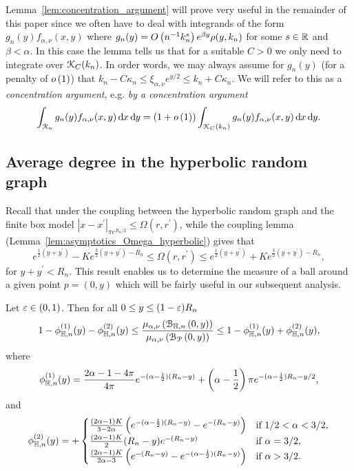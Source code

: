 \begin{remark}\label{rmk:concentration_argument}
Lemma~\ref{lem:concentration_argument} will prove very useful in the remainder of this paper since we often have to deal with integrands of the form $g_n(y) f_{\alpha,\nu}(x,y)$ where $g_n(y) = O\left(n^{-1} k_n^{s}\right)e^{\beta y}\rho(y,k_n)$ for some $s \in {\ensuremath{\mathbb R}}$ and $\beta < \alpha$. In this case the lemma tells us that for a suitable $C > 0$ we only need to integrate over ${\mathcal K}_C(k_n)$. In order words, we may always assume for $g_n(y)$ (for a penalty of $o\left(1\right)$) that $k_n - C \kappa_n \le \xi_{\alpha,\nu} e^{y/2} \le k_n + C \kappa_n$. We will refer to this as a \emph{concentration argument}, e.g. \emph{by a concentration argument}
\[
	\int_{{\mathcal R}_n} g_n(y) f_{\alpha, \nu}(x,y) \operatorname{\mathrm{d}\hspace{-2pt}} x \operatorname{\mathrm{d}\hspace{-2pt}} y 
	= (1+o\left(1\right)) \int_{{\mathcal K}_C(k_n)} g_n(y) f_{\alpha, \nu}(x,y) \operatorname{\mathrm{d}\hspace{-2pt}} x \operatorname{\mathrm{d}\hspace{-2pt}} y.
\]
\end{remark}

\subsection{Average degree in the hyperbolic random graph}\label{ssec:average_degree_HP_n}

Recall that under the coupling between the hyperbolic random graph and the finite box model $|x-x^\prime|_{\pi e^{R_n/2}} \le \Omega(r,r^\prime)$, while the coupling lemma (Lemma~\ref{lem:asymptotics_Omega_hyperbolic}) gives that  
\[
	e^{\frac{1}{2}(y+y^\prime)} - K e^{\frac{3}{2}(y+y^\prime) - R_n} \leq \Omega(r, r^\prime) 
		\leq  e^{\frac{1}{2}(y+y^\prime)} + K e^{\frac{3}{2}(y+y^\prime) - R_n},
\]
for $y + y^\prime < R_n$. This result enables us to determine the measure of a ball around a given point $p=(0,y)$ which will be fairly useful in our subsequent analysis. 

\begin{lemma}\label{lem:average_degree_hyperbolic}
Let $\varepsilon \in (0, 1)$. Then for all $0 \le y \le (1 - \varepsilon)R_n$
\[
	 1 - \phi_{\mathbb{H},n}^{(1)}(y) - \phi_{\mathbb{H},n}^{(2)}(y) \le \frac{\mu_{\alpha,\nu}\left({\mathcal B}_{\mathbb{H},n}\left(0,y\right)\right)}{\mu_{\alpha,\nu}\left({\mathcal B}_{{\mathcal P}}\left(0,y\right)\right)} 
	 \le 1 - \phi_{\mathbb{H},n}^{(1)}(y) + \phi_{\mathbb{H},n}^{(2)}(y),
\]
where
\[
	\phi_{\mathbb{H},n}^{(1)}(y) = \frac{2\alpha - 1 - 4\pi}{4\pi} e^{-(\alpha - \frac{1}{2})(R_n - y)} 
		+ \left(\alpha - \frac{1}{2}\right)\pi e^{-(\alpha - \frac{1}{2})R_n - y/2},
\]
and
\[
	\phi_{\mathbb{H},n}^{(2)}(y) = 
	+ \begin{cases}
			\frac{(2\alpha - 1)K}{3 - 2\alpha}\left(e^{-(\alpha - \frac{1}{2})(R_n - y)} - e^{-(R_n - y)}\right)
			&\mbox{if } 1/2 < \alpha < 3/2,\\
			\frac{(2\alpha -1)K}{2} (R_n - y)e^{-(R_n - y)} &\mbox{if } \alpha = 3/2,\\
			\frac{(2\alpha - 1)K}{2\alpha - 3} \left(e^{-(R_n - y)} - e^{-(\alpha - \frac{1}{2})(R_n - y)}\right)
			&\mbox{if } \alpha > 3/2.
		\end{cases}
\]
\end{lemma}

